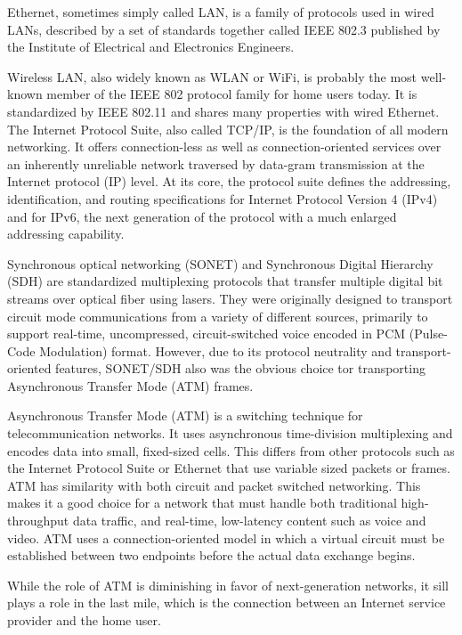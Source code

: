 \documentclass[a4paper]{article}
\begin{document}
\begin{enumerate}[label={\textbf{\Roman*.}},leftmargin=0pt,itemindent=*]
    Ethernet, sometimes simply called LAN, is a family of protocols used in
    wired LANs, described by a set of standards together called IEEE 802.3
    published by the Institute of Electrical and Electronics Engineers.

    Wireless LAN, also widely known as WLAN or WiFi, is probably the most
    well-known member of the IEEE 802 protocol family for home users today. It
    is standardized by IEEE 802.11 and shares many properties with wired
    Ethernet. The Internet Protocol Suite, also called TCP/IP, is the foundation
    of all modern networking. It offers connection-less as well as
    connection-oriented services over an inherently unreliable network traversed
    by data-gram transmission at the Internet protocol (IP) level. At its core,
    the protocol suite defines the addressing, identification, and routing
    specifications for Internet Protocol Version 4 (IPv4) and for IPv6, the next
    generation of the protocol with a much enlarged addressing capability.

    Synchronous optical networking (SONET) and Synchronous Digital Hierarchy
    (SDH) are standardized multiplexing protocols that transfer multiple digital
    bit streams over optical fiber using lasers. They were originally designed
    to transport circuit mode communications from a variety of different
    sources, primarily to support real-time, uncompressed, circuit-switched voice
    encoded in PCM (Pulse-Code Modulation) format. However, due to its protocol
    neutrality and transport-oriented features, SONET/SDH also was the obvious
    choice tor transporting Asynchronous Transfer Mode (ATM) frames.

    Asynchronous Transfer Mode (ATM) is a switching technique for
    telecommunication networks. It uses asynchronous time-division multiplexing
    and encodes data into small, fixed-sized cells. This differs from other
    protocols such as the Internet Protocol Suite or Ethernet that use variable
    sized packets or frames. ATM has similarity with both circuit and packet
    switched networking. This makes it a good choice for a network that must
    handle both traditional high-throughput data traffic, and real-time,
    low-latency content such as voice and video. ATM uses a connection-oriented
    model in which a virtual circuit must be established between two endpoints
    before the actual data exchange begins.

    While the role of ATM is diminishing in favor of next-generation networks,
    it sill plays a role in the last mile, which is the connection between an
    Internet service provider and the home user.


\end{enumerate}
\end{document}
